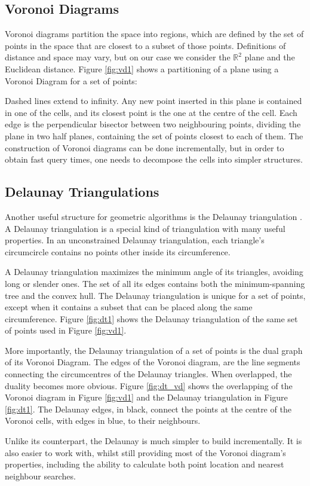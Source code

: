 \subsection{Voronoi Diagrams}
Voronoi diagrams \cite{tricard2} partition the space into regions, which are defined by the set of points in the space that are closest to a subset of those points. Definitions of distance and space may vary, but on our case we consider the $\mathbb{R}^2$ plane and the Euclidean distance.
Figure \ref{fig:vd1} shows a partitioning of a plane using a Voronoi Diagram for a set of points:

\noindent
Dashed lines extend to infinity. Any new point inserted in this plane is contained in one of the cells, and its closest point is the one at the centre of the cell.
Each edge is the perpendicular bisector between two neighbouring points, dividing the plane in two half planes, containing the set of points closest to each of them.
The construction of Voronoi diagrams can be done incrementally, but in order to obtain fast query times, one needs to decompose the cells into simpler structures. 
\subsection{Delaunay Triangulations}
Another useful structure for geometric algorithms is the Delaunay triangulation \cite{tricard2}.
A Delaunay triangulation \cite{delbible} is a special kind of triangulation with many useful properties. 
In an unconstrained Delaunay triangulation, each triangle's circumcircle contains no points other inside its circumference.

A Delaunay triangulation maximizes the minimum angle of its triangles, avoiding long or slender ones.
The set of all its edges contains both the minimum-spanning tree and the convex hull.
The Delaunay triangulation is unique for a set of points, except when it contains a subset that can be placed along the same circumference. Figure \ref{fig:dt1} shows the Delaunay triangulation of the same set of points used in Figure \ref{fig:vd1}.

\noindent
More importantly, the Delaunay triangulation of a set of points is the dual graph of its Voronoi Diagram. The edges of the Voronoi diagram, are the line segments connecting the circumcentres of the Delaunay triangles. When overlapped, the duality becomes more obvious. Figure \ref{fig:dt_vd} shows the overlapping of the Voronoi diagram in Figure \ref{fig:vd1} and the Delaunay  triangulation in Figure \ref{fig:dt1}. The Delaunay edges, in black, connect the points at the centre of the Voronoi cells, with edges in blue, to their neighbours.

\noindent
Unlike its counterpart, the Delaunay is much simpler to build incrementally. It is also easier to work with, whilst still providing most of the Voronoi diagram's properties, including the ability to calculate both point location and nearest neighbour searches.

